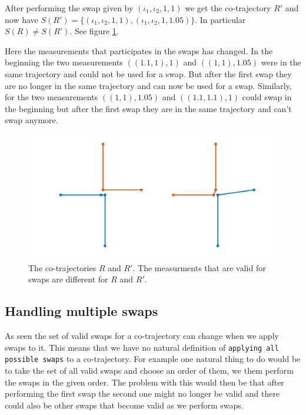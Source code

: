 \documentclass[11pt]{article}
\begin{document}
After performing the swap given by \((\iota_1, \iota_2, 1, 1)\) we get
the co-trajectory \(R'\) and now have \(S(R') = \{(\iota_1, \iota_2,
1, 1), (\iota_1, \iota_2, 1, 1.05)\}\). In particular \(S(R) \not=
S(R')\). See figure \ref{fig:org2db6100}.

Here the measurements that participates in the swaps has changed. In
the beginning the two measurements \(((1.1, 1), 1)\) and \(((1, 1),
1.05)\) were in the same trajectory and could not be used for a swap.
But after the first swap they are no longer in the same trajectory and
can now be used for a swap. Similarly, for the two measurements \(((1,
1), 1.05)\) and \(((1.1, 1.1), 1)\) could swap in the beginning but
after the first swap they are in the same trajectory and can't swap
anymore.
\begin{figure}[htbp]
\centering
\includegraphics[width=.9\linewidth]{./figures/swap-valid.pdf}
\caption{\label{fig:org2db6100}
The co-trajectories \(R\) and \(R'\). The measurments that are valid for swaps are different for \(R\) and \(R'\).}
\end{figure}
\subsection{Handling multiple swaps}
\label{sec:org24af9d0}
As seen the set of valid swaps for a co-trajectory can change when we
apply swaps to it. This means that we have no natural definition of
\texttt{applying all possible swaps} to a co-trajectory. For example one
natural thing to do would be to take the set of all valid swaps and
choose an order of them, we them perform the swaps in the given order.
The problem with this would then be that after performing the first
swap the second one might no longer be valid and there could also be
other swaps that become valid as we perform swaps.
\end{document}

